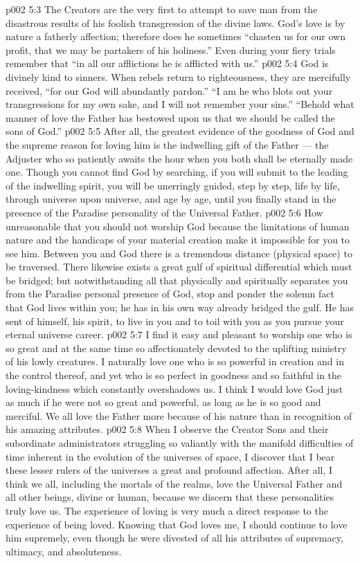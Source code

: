 \vs p002 5:3 The Creators are the very first to attempt to save man from the disastrous results of his foolish transgression of the divine laws. God’s love is by nature a fatherly affection; therefore does he sometimes “chasten us for our own profit, that we may be partakers of his holiness.” Even during your fiery trials remember that “in all our afflictions he is afflicted with us.”
\vs p002 5:4 God is divinely kind to sinners. When rebels return to righteousness, they are mercifully received, “for our God will abundantly pardon.” “I am he who blots out your transgressions for my own sake, and I will not remember your sins.” “Behold what manner of love the Father has bestowed upon us that we should be called the sons of God.”
\vs p002 5:5 After all, the greatest evidence of the goodness of God and the supreme reason for loving him is the indwelling gift of the Father --- the Adjuster who so patiently awaits the hour when you both shall be eternally made one. Though you cannot find God by searching, if you will submit to the leading of the indwelling spirit, you will be unerringly guided, step by step, life by life, through universe upon universe, and age by age, until you finally stand in the presence of the Paradise personality of the Universal Father.
\vs p002 5:6 \pc How unreasonable that you should not worship God because the limitations of human nature and the handicaps of your material creation make it impossible for you to see him. Between you and God there is a tremendous distance (physical space) to be traversed. There likewise exists a great gulf of spiritual differential which must be bridged; but notwithstanding all that physically and spiritually separates you from the Paradise personal presence of God, stop and ponder the solemn fact that God lives within you; he has in his own way already bridged the gulf. He has sent of himself, his spirit, to live in you and to toil with you as you pursue your eternal universe career.
\vs p002 5:7 I find it easy and pleasant to worship one who is so great and at the same time so affectionately devoted to the uplifting ministry of his lowly creatures. I naturally love one who is so powerful in creation and in the control thereof, and yet who is so perfect in goodness and so faithful in the loving\hyp{}kindness which constantly overshadows us. I think I would love God just as much if he were not so great and powerful, as long as he is so good and merciful. We all love the Father more because of his nature than in recognition of his amazing attributes.
\vs p002 5:8 When I observe the Creator Sons and their subordinate administrators struggling so valiantly with the manifold difficulties of time inherent in the evolution of the universes of space, I discover that I bear these lesser rulers of the universes a great and profound affection. After all, I think we all, including the mortals of the realms, love the Universal Father and all other beings, divine or human, because we discern that these personalities truly love us. The experience of loving is very much a direct response to the experience of being loved. Knowing that God loves me, I should continue to love him supremely, even though he were divested of all his attributes of supremacy, ultimacy, and absoluteness.
